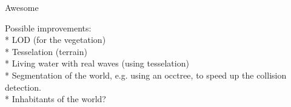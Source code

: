 Awesome

Possible improvements:\\
* LOD (for the vegetation)\\
* Tesselation (terrain)\\
* Living water with real waves (using tesselation)\\
* Segmentation of the world, e.g. using an occtree, to speed up the collision detection.\\
* Inhabitants of the world?

















